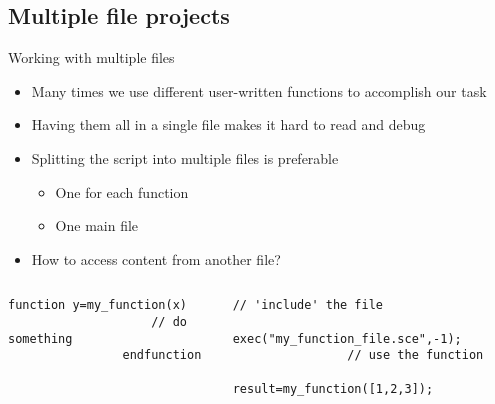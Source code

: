 \documentclass[%
    10pt,
    xcolor={dvipsnames},
    compress, %
]{beamer}
\newcommand{\setitemsep}[1]{\setlength\itemsep{#1}}
\begin{document}
\subsection{Multiple file projects}
\begin{frame}[fragile]{Working with multiple files}
    \begin{itemize}
        \setitemsep{1em}
        \item Many times we use different user-written functions to accomplish our task
        \item Having them all in a single file makes it hard to read and debug
        \item<2-> Splitting the script into multiple files is preferable
        \begin{itemize}
            \item One for each function
            \item One main file
        \end{itemize}
        \item<3-> How to access content from another file?
    \end{itemize}
    \begin{columns}
        \begin{column}{0.5\linewidth}
            \begin{lstlisting}[title={\small \inlinecode{my\_function\_file.sce}}]
                function y=my_function(x)
                    // do something
                endfunction
            \end{lstlisting}
        \end{column}
        \begin{column}{0.5\linewidth}
            \begin{lstlisting}[title={\small \inlinecode{main.sce}}]
                // 'include' the file
                exec("my_function_file.sce",-1);
                // use the function
                result=my_function([1,2,3]);
            \end{lstlisting}
        \end{column}
    \end{columns}
\end{frame}
\end{document}
